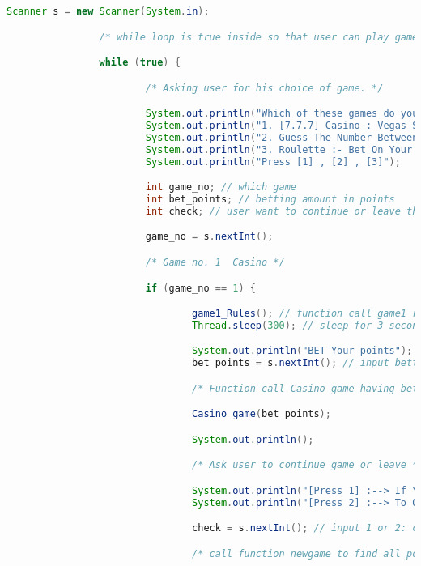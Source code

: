 \documentclass[]{article}
\begin{document}
\begin{lstlisting}[language=Java]
                Scanner s = new Scanner(System.in);

                /* while loop is true inside so that user can play game again and again */

                while (true) {

                        /* Asking user for his choice of game. */

                        System.out.println("Which of these games do you like to play :- \n");
                        System.out.println("1. [7.7.7] Casino : Vegas Slot game ");
                        System.out.println("2. Guess The Number Between [1 - 50] ");
                        System.out.println("3. Roulette :- Bet On Your Numbers\n ");
                        System.out.println("Press [1] , [2] , [3]");

                        int game_no; // which game
                        int bet_points; // betting amount in points
                        int check; // user want to continue or leave the game

                        game_no = s.nextInt();

                        /* Game no. 1  Casino */

                        if (game_no == 1) {

                                game1_Rules(); // function call game1 rules
                                Thread.sleep(300); // sleep for 3 seconds

                                System.out.println("BET Your points");
                                bet_points = s.nextInt(); // input betted points

                                /* Function call Casino game having bet points as parameters */

                                Casino_game(bet_points);

                                System.out.println();

                                /* Ask user to continue game or leave */

                                System.out.println("[Press 1] :--> If You Like To Try Another game");
                                System.out.println("[Press 2] :--> To QUIT");

                                check = s.nextInt(); // input 1 or 2: continue or leave

                                /* call function newgame to find all possibilities */


\end{lstlisting}
\end{document}
